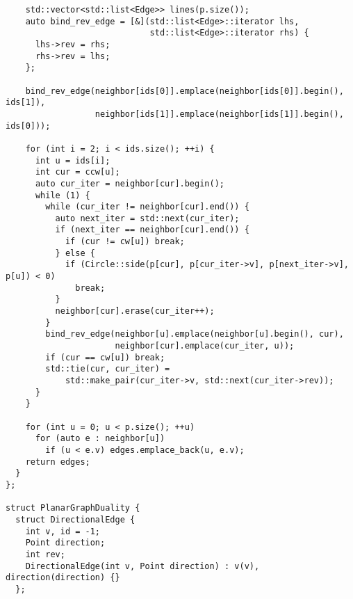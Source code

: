 \documentclass{article}
\begin{document}
\begin{multicols}{2}
\begin{lstlisting}
    std::vector<std::list<Edge>> lines(p.size());
    auto bind_rev_edge = [&](std::list<Edge>::iterator lhs,
                             std::list<Edge>::iterator rhs) {
      lhs->rev = rhs;
      rhs->rev = lhs;
    };

    bind_rev_edge(neighbor[ids[0]].emplace(neighbor[ids[0]].begin(), ids[1]),
                  neighbor[ids[1]].emplace(neighbor[ids[1]].begin(), ids[0]));

    for (int i = 2; i < ids.size(); ++i) {
      int u = ids[i];
      int cur = ccw[u];
      auto cur_iter = neighbor[cur].begin();
      while (1) {
        while (cur_iter != neighbor[cur].end()) {
          auto next_iter = std::next(cur_iter);
          if (next_iter == neighbor[cur].end()) {
            if (cur != cw[u]) break;
          } else {
            if (Circle::side(p[cur], p[cur_iter->v], p[next_iter->v], p[u]) < 0)
              break;
          }
          neighbor[cur].erase(cur_iter++);
        }
        bind_rev_edge(neighbor[u].emplace(neighbor[u].begin(), cur),
                      neighbor[cur].emplace(cur_iter, u));
        if (cur == cw[u]) break;
        std::tie(cur, cur_iter) =
            std::make_pair(cur_iter->v, std::next(cur_iter->rev));
      }
    }

    for (int u = 0; u < p.size(); ++u)
      for (auto e : neighbor[u])
        if (u < e.v) edges.emplace_back(u, e.v);
    return edges;
  }
};

struct PlanarGraphDuality {
  struct DirectionalEdge {
    int v, id = -1;
    Point direction;
    int rev;
    DirectionalEdge(int v, Point direction) : v(v), direction(direction) {}
  };


\end{lstlisting}
\end{multicols}
\end{document}
